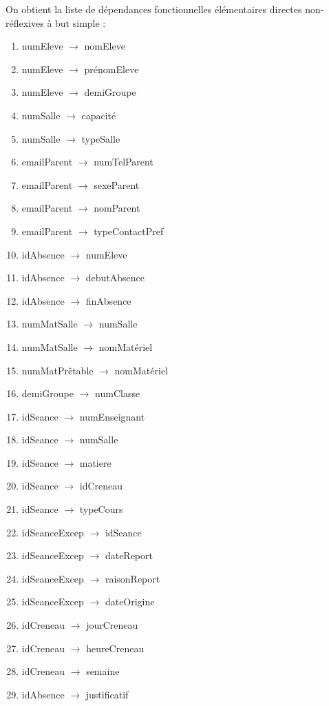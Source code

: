 \documentclass[12pt,french,titlepage]{article}
\begin{document}
	  On obtient la liste de dépendances fonctionnelles  élémentaires directes non-réflexives à but
      simple :
      
      \begin{enumerate}
          \item numEleve $\rightarrow$ nomEleve  
\item	numEleve $\rightarrow$ prénomEleve   
\item numEleve	$\rightarrow$ demiGroupe   

\item numSalle $\rightarrow$ capacité    
\item	numSalle $\rightarrow$ typeSalle   

\item emailParent $\rightarrow$ numTelParent   
\item	   emailParent $\rightarrow$ sexeParent    
\item	   emailParent $\rightarrow$ nomParent	   
\item emailParent $\rightarrow$ typeContactPref   

\item idAbsence $\rightarrow$ numEleve    
\item	 idAbsence $\rightarrow$ debutAbsence   
\item	 idAbsence $\rightarrow$ finAbsence  

\item numMatSalle $\rightarrow$ numSalle   
	\item   numMatSalle $\rightarrow$ nomMatériel 

\item numMatPrêtable $\rightarrow$ nomMatériel

\item demiGroupe $\rightarrow$ numClasse   

\item idSeance $\rightarrow$ numEnseignant   
\item	idSeance $\rightarrow$ numSalle    
\item	idSeance $\rightarrow$ matiere    
\item	idSeance $\rightarrow$ idCreneau   
\item	idSeance $\rightarrow$ typeCours    

\item idSeanceExcep $\rightarrow$ idSeance   
\item	     idSeanceExcep $\rightarrow$ dateReport   
\item	     idSeanceExcep $\rightarrow$ raisonReport   
\item	     idSeanceExcep $\rightarrow$ dateOrigine    

\item idCreneau $\rightarrow$ jourCreneau   
\item	 idCreneau $\rightarrow$ heureCreneau   
\item	 idCreneau $\rightarrow$ semaine  

\item idAbsence $\rightarrow$ justificatif
      \end{enumerate}
      
\end{document}
